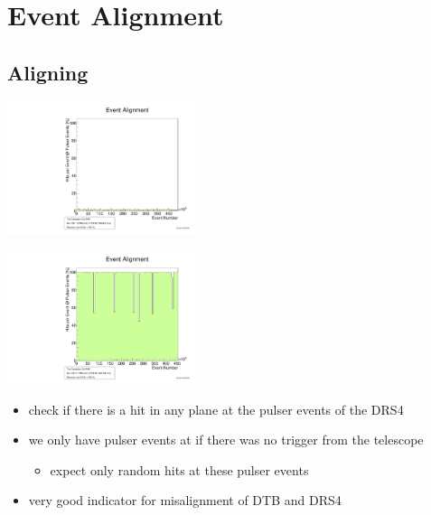 \documentclass[9pt]{beamer}
\begin{document}
\section{Event Alignment}
\subsection{Aligning}
\begin{frame}
	\begin{minipage}{5.5cm}
		\centering
		\includegraphics[angle=270, width=5.5cm]{EventAlignment430}
	\end{minipage}
	\hspace*{2pt}
	\begin{minipage}{5.5cm}
		\centering
		\includegraphics[angle=270, width=5.5cm]{EventAlignment429}
	\end{minipage}\s
	\begin{itemize}
		\item check if there is a hit in any plane at the pulser events of the DRS4
		\item we only have pulser events at if there was no trigger from the telescope
		\begin{itemize}
			\item expect only random hits at these pulser events
		\end{itemize}
		\item very good indicator for misalignment of DTB and DRS4
	\end{itemize}
\end{frame}
\end{document}
